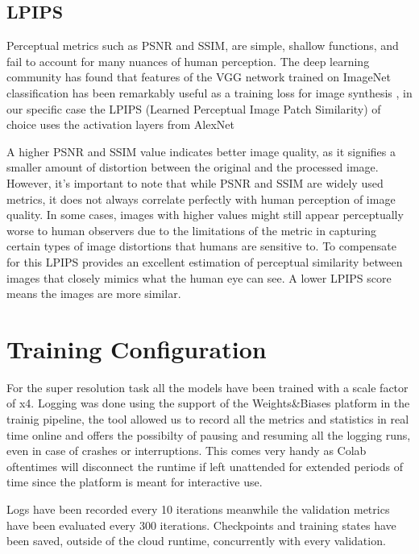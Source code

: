 \subsection{LPIPS}
\label{subsec:LPIPS}
  Perceptual metrics such as PSNR and SSIM, are simple, shallow functions, and fail to account for many nuances of human perception. The deep learning community has found that features
  of the VGG network trained on ImageNet classification has
  been remarkably useful as a training loss for image synthesis \cite{zhang2018unreasonable}, in our specific case the LPIPS (Learned Perceptual Image Patch Similarity) of choice uses the activation layers from AlexNet \cite{NIPS2012_c399862d}


A higher PSNR and SSIM value indicates better image quality, as it signifies a smaller amount of distortion between the original and the processed image. However, it's important to note that while PSNR and SSIM are widely used metrics, it does not always correlate perfectly with human perception of image quality. In some cases, images with higher values might still appear perceptually worse to human observers due to the limitations of the metric in capturing certain types of image distortions that humans are sensitive to. To compensate for this LPIPS provides an excellent estimation of perceptual similarity between images that closely mimics what the human eye can see. A lower LPIPS score means the images are more similar.

\section{Training Configuration}
\label{sec:configuration}

For the super resolution task all the models have been trained with a scale factor of x4. Logging was done using the support of the Weights\&Biases platform in the trainig pipeline, the tool allowed us to record all the metrics and statistics in real time online and offers the possibilty of pausing and resuming all the logging runs, even in case of crashes or interruptions. This comes very handy as Colab oftentimes will disconnect the runtime if left unattended for extended periods of time since the platform is meant for interactive use.

Logs have been recorded every 10 iterations meanwhile the validation metrics have been evaluated every 300 iterations. Checkpoints and training states have been saved, outside of the cloud runtime, concurrently with every validation.
